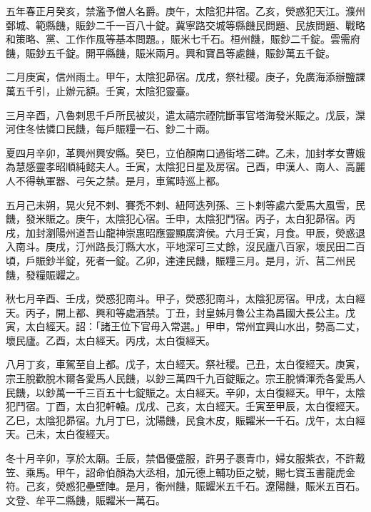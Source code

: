 
\begin{pinyinscope}

 五年春正月癸亥，禁濫予僧人名爵。庚午，太陰犯井宿。乙亥，熒惑犯天江。濮州鄄城、範縣饑，賑鈔二千一百八十錠。冀寧路交城等縣饑民問題、民族問題、戰略和策略、黨、工作作風等基本問題。，賑米七千石。桓州饑，賑鈔二千錠。雲需府饑，賑鈔五千錠。開平縣饑，賑米兩月。興和寶昌等處饑，賑鈔萬五千錠。



 二月庚寅，信州雨土。甲午，太陰犯昴宿。戊戌，祭社稷。庚子，免廣海添辦鹽課萬五千引，止辦元額。壬寅，太陰犯靈臺。



 三月辛酉，八魯剌思千戶所民被災，遣太禧宗禋院斷事官塔海發米賑之。戊辰，灤河住冬怯憐口民饑，每戶賑糧一石、鈔二十兩。



 夏四月辛卯，革興州興安縣。癸巳，立伯顏南口過街塔二碑。乙未，加封孝女曹娥為慧感靈孝昭順純懿夫人。壬寅，太陰犯日星及房宿。己酉，申漢人、南人、高麗人不得執軍器、弓矢之禁。是月，車駕時巡上都。



 五月己未朔，晃火兒不剌、賽禿不剌、紐阿迭列孫、三卜剌等處六愛馬大風雪，民饑，發米賑之。庚午，太陰犯心宿。壬申，太陰犯鬥宿。丙子，太白犯昴宿。丙戌，加封瀏陽州道吾山龍神崇惠昭應靈顯廣濟侯。六月壬寅，月食。甲辰，熒惑退入南斗。庚戌，汀州路長汀縣大水，平地深可三丈餘，沒民廬八百家，壞民田二百頃，戶賑鈔半錠，死者一錠。乙卯，達達民饑，賑糧三月。是月，沂、莒二州民饑，發糧賑糶之。



 秋七月辛酉、壬戌，熒惑犯南斗。甲子，熒惑犯南斗，太陰犯房宿。甲戌，太白經天。丙子，開上都、興和等處酒禁。丁丑，封皇姊月魯公主為昌國大長公主。戊寅，太白經天。詔：「諸王位下官毋入常選。」甲申，常州宜興山水出，勢高二丈，壞民廬。乙酉，太白經天。丙戌，太白復經天。



 八月丁亥，車駕至自上都。戊子，太白經天。祭社稷。己丑，太白復經天。庚寅，宗王脫歡脫木爾各愛馬人民饑，以鈔三萬四千九百錠賑之。宗王脫憐渾禿各愛馬人民饑，以鈔萬一千三百五十七錠賑之。太白經天。辛卯，太白復經天。甲午，太陰犯鬥宿。丁酉，太白犯軒轅。戊戌、己亥，太白經天。壬寅至甲辰，太白復經天。乙巳，太陰犯昴宿。九月丁巳，沈陽饑，民食木皮，賑糶米一千石。戊午，太白經天。己未，太白復經天。



 冬十月辛卯，享於太廟。壬辰，禁倡優盛服，許男子裹青巾，婦女服紫衣，不許戴笠、乘馬。甲午，詔命伯顏為大丞相，加元德上輔功臣之號，賜七寶玉書龍虎金符。己亥，熒惑犯壘壁陣。是月，衡州饑，賑糶米五千石。遼陽饑，賑米五百石。文登、牟平二縣饑，賑糶米一萬石。




\end{pinyinscope}
